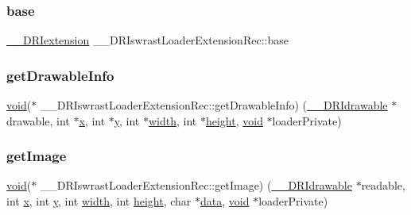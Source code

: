 \subsubsection{\texorpdfstring{base}{base}}
{\footnotesize\ttfamily \hyperlink{dri__interface_8h_a4e0a61c8ece00d2b2c6792a9a1b55385}{\+\_\+\+\_\+\+D\+R\+Iextension} \+\_\+\+\_\+\+D\+R\+Iswrast\+Loader\+Extension\+Rec\+::base}

\mbox{\label{struct_____d_r_iswrast_loader_extension_rec_ac0e232e86beb80b3eab60660cc4facff}} 
\subsubsection{\texorpdfstring{get\+Drawable\+Info}{getDrawableInfo}}
{\footnotesize\ttfamily \hyperlink{_s_d_l__opengles2__gl2ext_8h_ae5d8fa23ad07c48bb609509eae494c95}{void}($\ast$ \+\_\+\+\_\+\+D\+R\+Iswrast\+Loader\+Extension\+Rec\+::get\+Drawable\+Info) (\hyperlink{dri__interface_8h_a5bfb832a0a08208d95b3bbef439d2262}{\+\_\+\+\_\+\+D\+R\+Idrawable} $\ast$drawable, int $\ast$\hyperlink{gl_8h_ad0e63d0edcdbd3d79554076bf309fd47}{x}, int $\ast$\hyperlink{gl_8h_a1675d9d7bb68e1657ff028643b4037e3}{y}, int $\ast$\hyperlink{gl_8h_a9a82cf3caff84cabc4598e2619faac17}{width}, int $\ast$\hyperlink{gl_8h_aa352f2804b9902ac30769c00dde75d5f}{height}, \hyperlink{_s_d_l__opengles2__gl2ext_8h_ae5d8fa23ad07c48bb609509eae494c95}{void} $\ast$loader\+Private)}

\mbox{\label{struct_____d_r_iswrast_loader_extension_rec_a785b8ff71b571ce721fe8582902ef737}} 
\subsubsection{\texorpdfstring{get\+Image}{getImage}}
{\footnotesize\ttfamily \hyperlink{_s_d_l__opengles2__gl2ext_8h_ae5d8fa23ad07c48bb609509eae494c95}{void}($\ast$ \+\_\+\+\_\+\+D\+R\+Iswrast\+Loader\+Extension\+Rec\+::get\+Image) (\hyperlink{dri__interface_8h_a5bfb832a0a08208d95b3bbef439d2262}{\+\_\+\+\_\+\+D\+R\+Idrawable} $\ast$readable, int \hyperlink{gl_8h_ad0e63d0edcdbd3d79554076bf309fd47}{x}, int \hyperlink{gl_8h_a1675d9d7bb68e1657ff028643b4037e3}{y}, int \hyperlink{gl_8h_a9a82cf3caff84cabc4598e2619faac17}{width}, int \hyperlink{gl_8h_aa352f2804b9902ac30769c00dde75d5f}{height}, char $\ast$\hyperlink{gl_8h_a2e335d56e2846b0fea47eed068b2d34a}{data}, \hyperlink{_s_d_l__opengles2__gl2ext_8h_ae5d8fa23ad07c48bb609509eae494c95}{void} $\ast$loader\+Private)}

